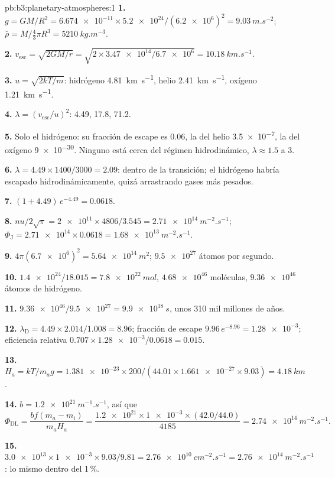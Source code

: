 \begin{solution}{pb:b3:planetary-atmospheres:1}
\textbf{1.} $g = GM/R^2 = \num{6.674e-11}\times\num{5.2e24}/(\num{6.2e6})^2 =
\qty{9.03}{m.s^{-2}}$; $\bar\rho = M/\tfrac43\pi R^3 = \qty{5210}{kg.m^{-3}}$.

\textbf{2.} $v_\mathrm{esc} = \sqrt{2GM/r} = \sqrt{2\times\num{3.47e14}/\num{6.7e6}}
= \qty{10.18}{km.s^{-1}}$.

\textbf{3.} $u = \sqrt{2kT/m}$: hidrógeno \qty{4.81}{km.s^{-1}}, helio
\qty{2.41}{km.s^{-1}}, oxígeno \qty{1.21}{km.s^{-1}}.

\textbf{4.} $\lambda = (v_\mathrm{esc}/u)^2$: 4.49, 17.8, 71.2.

\textbf{5.} Solo el hidrógeno: su fracción de escape es 0.06, la del helio
\num{3.5e-7}, la del oxígeno \num{9e-30}. Ninguno está cerca del régimen hidrodinámico,
$\lambda \approx 1.5$ a 3.

\textbf{6.} $\lambda = 4.49\times1400/3000 = 2.09$: dentro de la transición;
el hidrógeno habría escapado hidrodinámicamente, quizá arrastrando
gases más pesados.

\textbf{7.} $(1 + 4.49)\,e^{-4.49} = 0.0618$.

\textbf{8.} $n u/2\sqrt\pi = \num{2e11}\times4806/3.545 = \qty{2.71e14}{m^{-2}.s^{-1}}$;
$\Phi_\mathrm J = \num{2.71e14}\times0.0618 = \qty{1.68e13}{m^{-2}.s^{-1}}$.

\textbf{9.} $4\pi(\num{6.7e6})^2 = \qty{5.64e14}{m^2}$; $\num{9.5e27}$ átomos por
segundo.

\textbf{10.} $\num{1.4e24}/18.015 = \qty{7.8e22}{mol}$, $\num{4.68e46}$ moléculas,
$\num{9.36e46}$ átomos de hidrógeno.

\textbf{11.} $\num{9.36e46}/\num{9.5e27} = \qty{9.9e18}{s}$, unos 310 mil millones de
años.

\textbf{12.} $\lambda_\mathrm D = 4.49\times2.014/1.008 = 8.96$; fracción de escape
$9.96\,e^{-8.96} = \num{1.28e-3}$; eficiencia relativa $0.707\times
\num{1.28e-3}/0.0618 = 0.015$.

\textbf{13.} $H_a = kT/m_a g = \num{1.381e-23}\times200/(44.01\times\num{1.661e-27}
\times9.03) = \qty{4.18}{km}$.

\textbf{14.} $b = \qty{1.2e21}{m^{-1}.s^{-1}}$, así que
\[
\Phi_\mathrm{DL} = \frac{b f(m_a - m_i)}{m_a H_a}
= \frac{\num{1.2e21}\times\num{1e-3}\times(42.0/44.0)}{4185}
= \qty{2.74e14}{m^{-2}.s^{-1}}.
\]

\textbf{15.} $\num{3.0e13}\times\num{1e-3}\times9.03/9.81 =
\qty{2.76e10}{cm^{-2}.s^{-1}} = \qty{2.76e14}{m^{-2}.s^{-1}}$: lo mismo
dentro del 1\,\%.


\end{solution}
